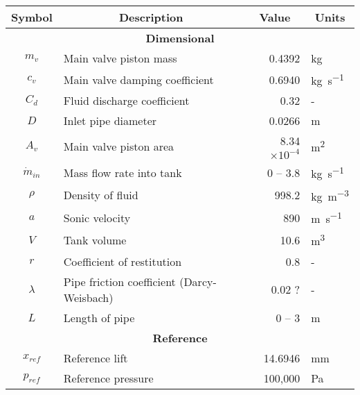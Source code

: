\begin{table}[ht]
    \centering
    \begin{tabular}{c|l|r|l}
        \large \textbf{Symbol} &  \multicolumn{1}{c}{\large \textbf{Description}} & \multicolumn{1}{|c}{\large \textbf{Value}} & \multicolumn{1}{|c}{\large \textbf{Units}} \\ \hline \hline
        \multicolumn{4}{c}{\textbf{Dimensional}} \\ \hline
        $m_v$ & Main valve piston mass & 0.4392 & \si{kg} \\ \hline %
        $c_v$ & Main valve damping coefficient & 0.6940 & \si{kg.s^{-1}} \\ \hline %
        $C_d$ & Fluid discharge coefficient & 0.32 & - \\ \hline %
        $D$ & Inlet pipe diameter & 0.0266 & \si{m} \\ \hline %
        $A_v$ & Main valve piston area & 8.34 $\times 10^{-4}$ & \si{m^2} \\ \hline %
        $\dot{m}_{in}$ & Mass flow rate into tank & 0 -- 3.8 & \si{kg.s^{-1}} \\ \hline %
        $\rho$ & Density of fluid & 998.2 & \si{kg.m^{-3}} \\ \hline %
        $a$ & Sonic velocity & 890 & \si{m.s^{-1}} \\ \hline %
        $V$ & Tank volume & 10.6 & \si{m^3} \\ \hline %
        $r$ & Coefficient of restitution & 0.8 & - \\ \hline %
        $\lambda$ & Pipe friction coefficient (Darcy-Weisbach) & 0.02 ? & - \\ \hline %
        $L$ & Length of pipe & 0 -- 3 & \si{m} \\ \hline \hline %
        \multicolumn{4}{c}{\textbf{Reference}} \\ \hline
        $x_{ref}$ & Reference lift & 14.6946 & \si{mm} \\ \hline %
        $p_{ref}$ & Reference pressure & 100,000 & \si{Pa} \\ \hline

\end{tabular}
\end{table}

